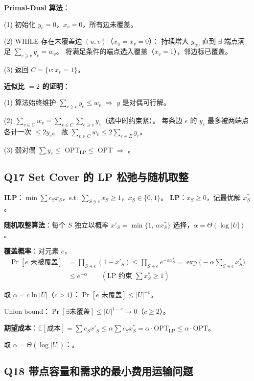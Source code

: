 \documentclass[11pt,a4paper]{ctexart}
\newcommand{\E}{\mathbb{E}}
\begin{document}
\textbf{Primal-Dual 算法}：

(1) 初始化 $y_e=0$，$x_v=0$，所有边未覆盖。

(2) WHILE 存在未覆盖边 $(u,v)$（$x_u=x_v=0$）：
持续增大 $y_{uv}$ 直到 $\exists$ 端点满足 $\sum_{e\ni v} y_e = w_v$。
将满足条件的端点选入覆盖（$x_v=1$），邻边标已覆盖。

(3) 返回 $C = \{v: x_v=1\}$。

\textbf{近似比 $=2$ 的证明}：

(1) 算法始终维护 $\sum_{e\ni v}y_e \leq w_v$ $\Rightarrow$ $y$ 是对偶可行解。

(2) $\sum_{v\in C} w_v = \sum_{v\in C}\sum_{e\ni v} y_e$（选中时约束紧）。
每条边 $e$ 的 $y_e$ 最多被两端点各计一次 $\leq 2y_e$。
故 $\sum_{v\in C} w_v \leq 2\sum_{e\in E} y_e$。

(3) 弱对偶 $\sum y_e \leq$ OPT$_ {\text{LP}} \leq$ OPT $\Rightarrow$ 。


\subsection*{Q17 \quad Set Cover 的 LP 松弛与随机取整}

\textbf{ILP}：$\min\sum c_S x_S$，s.t. $\sum_{S\ni e} x_S \geq 1$，$x_S\in\{0,1\}$。
\textbf{LP}：$x_S \geq 0$，记最优解 $x^*_S$。

\textbf{随机取整算法}：每个 $S$ 独立以概率 $x'_S = \min\{1,\, \alpha x^*_S\}$ 选择，$\alpha = \Theta(\log|U|)$。

\textbf{覆盖概率}：对元素 $e$，
\begin{align*}
\Pr[e\text{ 未被覆盖}] &= \prod_{S\ni e}(1-x'_S)
\leq \prod_{S\ni e} e^{-\alpha x^*_S}
= \exp\!\big(-\alpha\!\sum_{S\ni e} x^*_S\big) \\
&\leq e^{-\alpha} \qquad (\text{LP 约束 } \sum x^*_S \geq 1)
\end{align*}

取 $\alpha = c\ln|U|$（$c>1$）：$\Pr[e\text{ 未覆盖}] \leq |U|^{-c}$。

Union bound：$\Pr[\exists\text{未覆盖}] \leq |U|^{1-c} \to 0$（$c\geq2$）。

\textbf{期望成本}：$\E[\text{成本}] = \sum c_S x'_S \leq \alpha\sum c_S x^*_S = \alpha\cdot\text{OPT}_{\text{LP}} \leq \alpha\cdot\text{OPT}$。

取 $\alpha = \Theta(\log|U|)$：。


\subsection*{Q18 \quad 带点容量和需求的最小费用运输问题}
\end{document}
